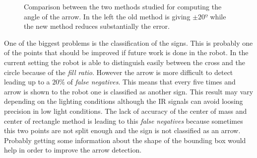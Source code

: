 \begin{figure}[h]
\centering
{}
\caption{Comparison between the two methods studied for computing the angle of the arrow. In the left the old method is giving $\pm 20º$ while the new method reduces substantially the error.}
\label{fig:angle}
\end{figure}

One of the biggest problems is the classification of the signs. This is probably one of the points that should be improved if future work is done in the robot. In the current setting the robot is able to distinguish easily between the cross and the circle because of the \textit{fill ratio}. However the arrow is more difficult to detect leading up to a $20\%$ of \textit{false negatives}. This means that every five times and arrow is shown to the robot one is classified as another sign. This result may vary depending on the lighting conditions although the IR signals can avoid loosing precision in low light conditions. The lack of accuracy of the center of mass and center of rectangle method is leading to this \textit{false negatives} because sometimes this two points are not split enough and the sign is not classified as an arrow. Probably getting some information about the shape of the bounding box would help in order to improve the arrow detection.

